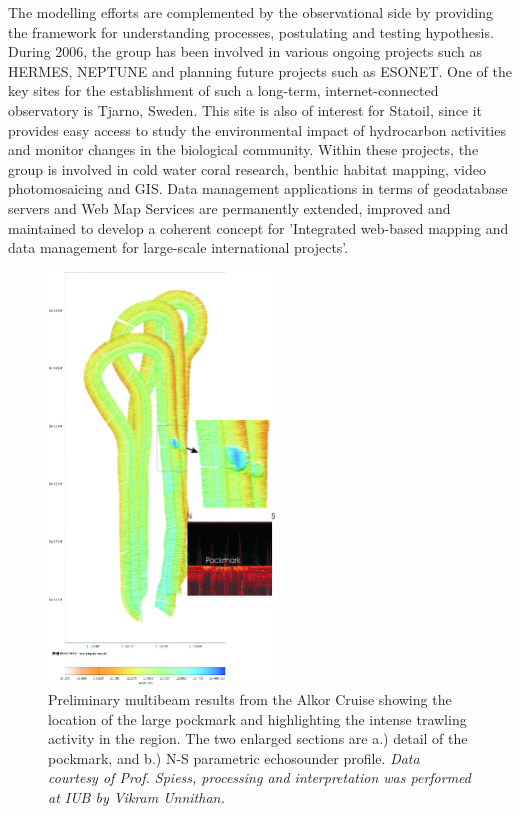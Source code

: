 The modelling efforts are complemented by the observational side by providing the framework for understanding processes, postulating and testing hypothesis. During 2006, the group has been involved in various ongoing projects such as HERMES, NEPTUNE and planning future projects such as ESONET. One of the key sites for the establishment of such a long-term, internet-connected observatory is Tjarno, Sweden. This site is also of interest for Statoil, since it provides easy access to study the environmental impact of hydrocarbon activities and monitor changes in the biological community. Within these projects, the group is involved in cold water coral research, benthic habitat mapping, video photomosaicing and GIS. Data management applications in terms of geodatabase servers and Web Map Services are permanently extended, improved and maintained to develop a coherent concept for 'Integrated web-based mapping and data management for large-scale international projects'.

\begin{figure}[ht]
  \begin{center}
    \includegraphics[width=6cm]{Unnithan/prof-unnithan-fig1}
    \caption{Preliminary multibeam results from the Alkor Cruise showing the location of the large pockmark and highlighting the intense trawling activity in the region. The two enlarged sections are a.) detail of the pockmark, and b.) N-S parametric echosounder profile. {\em Data courtesy of Prof. Spiess, processing and interpretation was performed at IUB by Vikram Unnithan.}}
    \label{fig:prof-unnithan}
   \end{center}
\end{figure}

